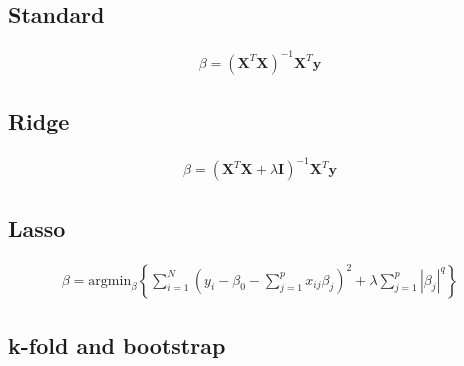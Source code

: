 \subsection{Standard}


\begin{align*}
    \beta = \left(
    \textbf{X}^T\textbf{X}
    \right)^{-1}
    \textbf{X}^T\textbf{y}
\end{align*}

\subsection{Ridge}

\begin{align*}
    \beta = \left(
    \textbf{X}^T\textbf{X}
     + \lambda \textbf{I}
     \right)^{-1}
    \textbf{X}^T\textbf{y}
\end{align*}

\subsection{Lasso}

\begin{align*}
    \beta = \text{argmin}_{\beta}
    \left\{
    \sum^N_{i=1}
    \left(
    y_i - \beta_0 -
    \sum_{j=1}^p x_{ij}\beta_j
    \right)^2
    + \lambda
    \sum^p_{j=1}|\beta_j|^q
    \right\}
\end{align*}

\subsection{k-fold and bootstrap}

